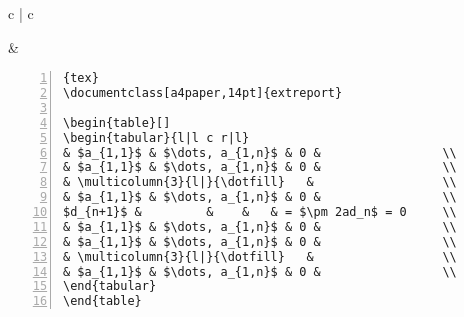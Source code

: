 \begin{tabular}{c | c}

\begin{minipage}[m]{0.4\textwidth}

\end{minipage}
&
\begin{minipage}[m]{0.55\textwidth}
\renewcommand\textminus{\mbox{-}}%
\begin{lstlisting}[numberstyle=\zebra{green!15}{yellow!15},numbers=left,basicstyle=\footnotesize]{tex}
\documentclass[a4paper,14pt]{extreport}

\begin{table}[]
\begin{tabular}{l|l c r|l}
& $a_{1,1}$ & $\dots, a_{1,n}$ & 0 &                 \\  
& $a_{1,1}$ & $\dots, a_{1,n}$ & 0 &                 \\ 
& \multicolumn{3}{l|}{\dotfill}   &                  \\  
& $a_{1,1}$ & $\dots, a_{1,n}$ & 0 &                 \\ 
$d_{n+1}$ &         &    &   & = $\pm 2ad_n$ = 0     \\  
& $a_{1,1}$ & $\dots, a_{1,n}$ & 0 &                 \\  
& $a_{1,1}$ & $\dots, a_{1,n}$ & 0 &                 \\ 
& \multicolumn{3}{l|}{\dotfill}   &                  \\ 
& $a_{1,1}$ & $\dots, a_{1,n}$ & 0 &                 \\ 
\end{tabular}
\end{table}

\end{lstlisting}
\end{minipage}
\end{tabular}

